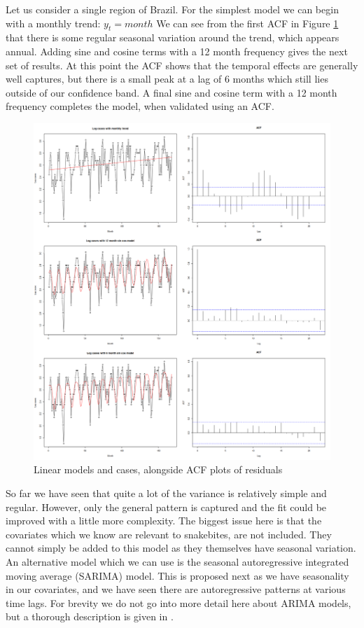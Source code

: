 \documentclass{article}
\begin{document}
Let us consider a single region of Brazil. For the simplest model we can begin with a monthly trend: $y_t = month$ We can see from the first ACF in Figure \ref{fig:sincos} that there is some regular seasonal variation around the trend, which appears annual. Adding sine and cosine terms with a 12 month frequency gives the next set of results. At this point the ACF shows that the temporal effects are generally well captures, but there is a small peak at a lag of 6 months which still lies outside of our confidence band. A final sine and cosine term with a 12 month frequency completes the model, when validated using an ACF.

\begin{figure}[h]
    \centering
    \includegraphics[scale=0.25]{images/sincosmodel.png}
    \caption{Linear models and cases, alongside ACF plots of residuals}
    \label{fig:sincos}
\end{figure}

So far we have seen that quite a lot of the variance is relatively simple and regular. However, only the general pattern is captured and the fit could be improved with a little more complexity. The biggest issue here is that the covariates which we know are relevant to snakebites, are not included. They cannot simply be added to this model as they themselves have seasonal variation. An alternative model which we can use is the seasonal autoregressive integrated moving average (SARIMA) model. This is proposed next as we have seasonality in our covariates, and we have seen there are autoregressive patterns at various time lags. For brevity we do not go into more detail here about ARIMA models, but a thorough description is given in \cite{damaTimeSeriesAnalysis2021}.
\end{document}
